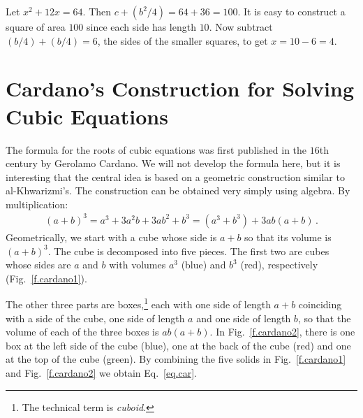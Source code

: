 \begin{example}
Let $x^2+12x=64$. Then $c+(b^2/4)=64+36=100$. It is easy to construct a square of area $100$ since each side has length $10$. Now subtract $(b/4)+(b/4)=6$, the sides of the smaller squares, to get $x=10-6=4$.
\end{example}

\section{Cardano's Construction for Solving Cubic Equations}\label{s.cardano}

The formula for the roots of cubic equations was first published in the $16$th century by Gerolamo Cardano. We will not develop the formula here, but it is interesting that the central idea is based on a geometric construction similar to al-Khwarizmi's. The construction can be obtained very simply using algebra. By multiplication:
\begin{align}\label{eq.car}
(a+b)^3=a^3+3a^2b+3ab^2+b^3=(a^3+b^3)+3ab(a+b)\,.
\end{align}
Geometrically, we start with a cube whose side is $a+b$ so that its volume is $(a+b)^3$. The cube is decomposed into five pieces. The first two are cubes whose sides are $a$ and $b$ with volumes $a^3$ (blue) and $b^3$ (red), respectively (Fig.~\ref{f.cardano1}).

The other three parts are boxes,\footnote{The technical term is \emph{cuboid}.} each with one side of length $a+b$ coinciding with a side of the cube, one side of length $a$ and one side of length $b$, so that the volume of each of the three boxes is $ab(a+b)$. In Fig.~\ref{f.cardano2}, there is one box at the left side of the cube (blue), one at the back of the cube (red) and one at the top of the cube (green).
By combining the five solids in Fig.~\ref{f.cardano1} and Fig.~\ref{f.cardano2} we obtain Eq.~\ref{eq.car}.


